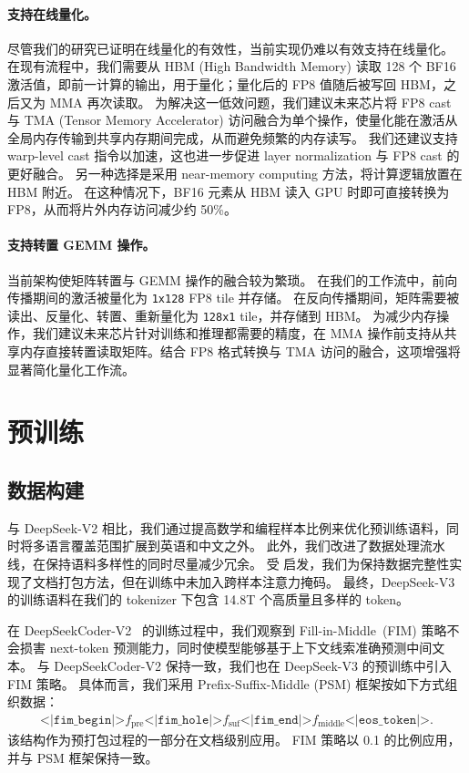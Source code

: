 \documentclass[11pt, a4paper, logo, copyright, nonumbering]{deepseek}
\newcommand{\dsvii}{DeepSeek-V2}
\newcommand{\dsviii}{DeepSeek-V3}
\begin{document}
\paragraph{支持在线量化。}
尽管我们的研究已证明在线量化的有效性，当前实现仍难以有效支持在线量化。
在现有流程中，我们需要从 HBM (High Bandwidth Memory) 读取 128 个 BF16 激活值，即前一计算的输出，用于量化；量化后的 FP8 值随后被写回 HBM，之后又为 MMA 再次读取。
为解决这一低效问题，我们建议未来芯片将 FP8 cast 与 TMA (Tensor Memory Accelerator) 访问融合为单个操作，使量化能在激活从全局内存传输到共享内存期间完成，从而避免频繁的内存读写。
我们还建议支持 warp-level cast 指令以加速，这也进一步促进 layer normalization 与 FP8 cast 的更好融合。
另一种选择是采用 near-memory computing 方法，将计算逻辑放置在 HBM 附近。
在这种情况下，BF16 元素从 HBM 读入 GPU 时即可直接转换为 FP8，从而将片外内存访问减少约 50\%。

\paragraph{支持转置 GEMM 操作。}
当前架构使矩阵转置与 GEMM 操作的融合较为繁琐。
在我们的工作流中，前向传播期间的激活被量化为 \texttt{1x128} FP8 tile 并存储。
在反向传播期间，矩阵需要被读出、反量化、转置、重新量化为 \texttt{128x1} tile，并存储到 HBM。
为减少内存操作，我们建议未来芯片针对训练和推理都需要的精度，在 MMA 操作前支持从共享内存直接转置读取矩阵。结合 FP8 格式转换与 TMA 访问的融合，这项增强将显著简化量化工作流。

\section{预训练}
\label{sec:pre-training}

\subsection{数据构建}

与 \dsvii{} 相比，我们通过提高数学和编程样本比例来优化预训练语料，同时将多语言覆盖范围扩展到英语和中文之外。
此外，我们改进了数据处理流水线，在保持语料多样性的同时尽量减少冗余。
受 \citet{Ding2024FewerTI} 启发，我们为保持数据完整性实现了文档打包方法，但在训练中未加入跨样本注意力掩码。
最终，\dsviii{} 的训练语料在我们的 tokenizer 下包含 14.8T 个高质量且多样的 token。

在 DeepSeekCoder-V2~\citep{dscodervii} 的训练过程中，我们观察到 Fill-in-Middle~(FIM) 策略不会损害 next-token 预测能力，同时使模型能够基于上下文线索准确预测中间文本。
与 DeepSeekCoder-V2 保持一致，我们也在 \dsviii{} 的预训练中引入 FIM 策略。
具体而言，我们采用 Prefix-Suffix-Middle (PSM) 框架按如下方式组织数据：
\begin{align}
\texttt{<|fim\_begin|>}f_{\text{pre}}\texttt{<|fim\_hole|>}f_{\text{suf}}\texttt{<|fim\_end|>}f_{\text{middle}}\texttt{<|eos\_token|>} . \nonumber
\end{align}
该结构作为预打包过程的一部分在文档级别应用。
FIM 策略以 0.1 的比例应用，并与 PSM 框架保持一致。
\end{document}
